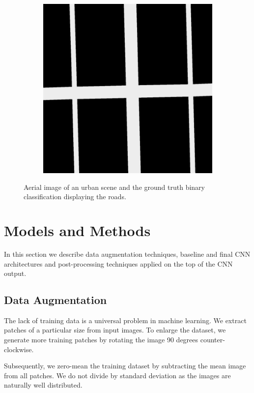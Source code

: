 \documentclass[10pt,conference,compsocconf]{IEEEtran}
\begin{document}
\begin{figure}
\begin{subfigure}{.2\textwidth}
		\includegraphics[width=1\textwidth]{figs/groundtruth1.png}
	\end{subfigure}
	\caption{Aerial image of an urban scene and the ground truth binary classification displaying the roads.}
	\label{fig:intro_example}
\end{figure}

\section{Models and Methods}
\label{sec:MM}
In this section we describe data augmentation techniques, baseline and final CNN architectures and post-processing techniques applied on the top of the CNN output.

\subsection{Data Augmentation}
\label{subsec:preprocessing}
The lack of training data is a universal problem in machine learning. We extract patches of a particular size from input images. To enlarge the dataset, we generate more training patches by rotating the image 90 degrees counter-clockwise.

Subsequently, we zero-mean the training dataset by subtracting the mean image from all patches. We do not divide by standard deviation as the images are naturally well distributed.
\end{document}
